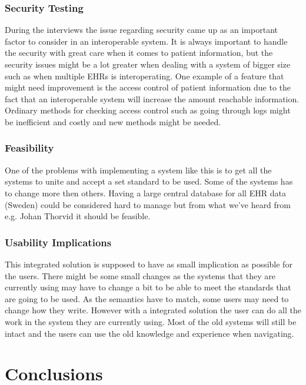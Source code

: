\documentclass[14pt]{article}
\begin{document}
\subsubsection{Security Testing}
During the interviews the issue regarding security came up as an important factor to consider in an interoperable system. It is always important to handle the security with great care when it comes to patient information, but the security issues might be a lot greater when dealing with a system of bigger size such as when multiple \glspl{EHR} is interoperating. One example of a feature that might need improvement is the access control of patient information due to the fact that an interoperable system will increase the amount reachable information. Ordinary methods for checking access control such as going through logs might be inefficient and costly and new methods might be needed.

\subsubsection{Feasibility}
One of the problems with implementing a system like this is to get all the systems to unite and accept a set standard to be used. Some of the systems has to change more then others.
Having a large central database for all \gls{EHR} data (Sweden) could be considered hard to manage but from what we've heard from e.g. Johan Thorvid \cite{Cambio} it should be feasible.

\subsubsection{Usability Implications}
This integrated solution is supposed to have as small implication as possible for the users. There might be some small changes as the systems that they are currently using may have to change a bit to be able to meet the standards that are going to be used. As the semantics have to match, some users may need to change how they write. However with a integrated solution the user can do all the work in the system they are currently using. Most of the old systems will still be intact and the users can use the old knowledge and experience when navigating.

\newpage

\section{Conclusions}
\label{sec:Conclusions}
\end{document}
